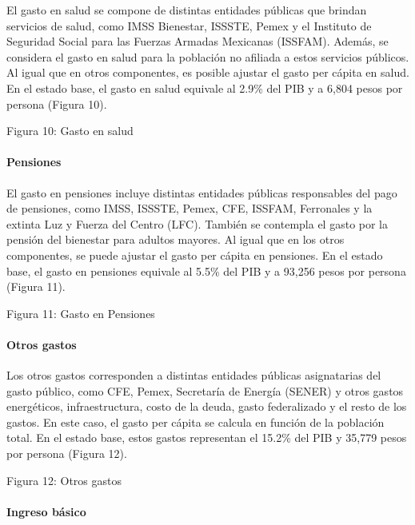 El gasto en salud se compone de distintas entidades públicas que brindan
servicios de salud, como IMSS Bienestar, ISSSTE, Pemex y el Instituto de
Seguridad Social para las Fuerzas Armadas Mexicanas (ISSFAM). Además, se
considera el gasto en salud para la población no afiliada a estos
servicios públicos. Al igual que en otros componentes, es posible
ajustar el gasto per cápita en salud. En el estado base, el gasto en
salud equivale al 2.9\% del PIB y a 6,804 pesos por persona (Figura 10).

Figura 10: Gasto en salud


\hypertarget{pensiones}{%
\paragraph{Pensiones}\label{pensiones}}

El gasto en pensiones incluye distintas entidades públicas responsables
del pago de pensiones, como IMSS, ISSSTE, Pemex, CFE, ISSFAM, Ferronales
y la extinta Luz y Fuerza del Centro (LFC). También se contempla el
gasto por la pensión del bienestar para adultos mayores. Al igual que en
los otros componentes, se puede ajustar el gasto per cápita en
pensiones. En el estado base, el gasto en pensiones equivale al 5.5\%
del PIB y a 93,256 pesos por persona (Figura 11).

Figura 11: Gasto en Pensiones


\hypertarget{otros-gastos}{%
\paragraph{Otros gastos}\label{otros-gastos}}

Los otros gastos corresponden a distintas entidades públicas
asignatarias del gasto público, como CFE, Pemex, Secretaría de Energía
(SENER) y otros gastos energéticos, infraestructura, costo de la deuda,
gasto federalizado y el resto de los gastos. En este caso, el gasto per
cápita se calcula en función de la población total. En el estado base,
estos gastos representan el 15.2\% del PIB y 35,779 pesos por persona
(Figura 12).

Figura 12: Otros gastos


\hypertarget{ingreso-buxe1sico}{%
\paragraph{\texorpdfstring{ Ingreso
básico}{ Ingreso básico}}\label{ingreso-buxe1sico}}

